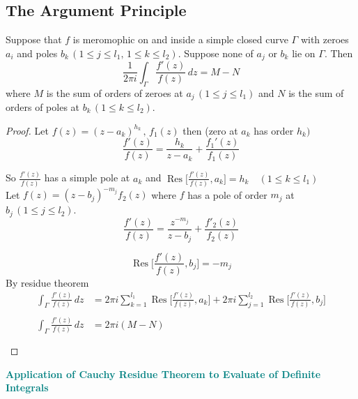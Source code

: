 \documentclass[11pt,a4paper]{article}
\theoremstyle{definition}
\begin{document}
{\color[wave]{485}\subsection{The Argument Principle}}
Suppose that $f$ is meromophic on and inside a simple closed curve $\Gamma$ with zeroes $a_i$ and poles $b_k\, ( 1\leq j\leq l_1,\, 1\leq k \leq l_2)$. Suppose none of $a_j$ or $b_k$ lie on $\Gamma$. Then $$\frac{1}{2\pi i}\int_{\Gamma} \frac{f'(z)}{f(z)}\,dz = M - N$$
where $M$ is the sum of orders of zeroes at $a_j\, (1\leq j\leq l_1)$ and $N$ is the sum of orders of poles at $b_k \, (1\leq k\leq l_2)$.\\





\begin{proof}
Let $f(z) = (z - a_k)^{h_k}\,,\, f_1(z) $ then (zero at $a_k$ has order $h_k)$ $$\frac{f'(z)}{f(z)} = \frac{h_k}{z - a_k} + \frac{f_1'(z)}{f_1(z)}$$

So $\frac{f'(z)}{f(z)}$ has a simple pole at $a_k$ and $\operatorname{Res}\Big[\frac{f'(z)}{f(z)}, a_k\Big] = h_k\quad  (1\leq k \leq l_1)$\\

Let $f(z) = (z - b_j)^{-m_j} f_2(z)$ where $f$ has a pole of order $m_j$ at $b_j\, (1\leq j \leq l_2)$.
$$\frac{f'(z)}{f(z)} = \frac{z^{-m_j}}{z - b_j} + \frac{f'_2(z)}{f_2(z)}$$

$$\operatorname{Res}\Big[\frac{f'(z)}{f(z)}, b_j\Big] = -m_j$$
By residue theorem
\begin{align*}
\int_{\Gamma} \frac{f'(z)}{f(z)}\,dz & = 2\pi i \sum^{l_1}_{k = 1}\operatorname{Res}\Big[\frac{f'(z)}{f(z)}, a_k\Big] + 2\pi i \sum^{l_2}_{j = 1}\operatorname{Res}\Big[\frac{f'(z)}{f(z)}, b_j\Big]\\\\
\int_{\Gamma} \frac{f'(z)}{f(z)}\,dz & = 2\pi i (M - N)\\\\
\end{align*}
\end{proof}

\textbf{\textcolor{teal}{Application of Cauchy Residue Theorem to Evaluate of Definite Integrals}}\\
\end{document}

